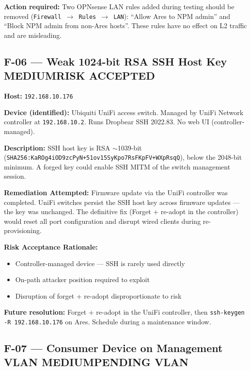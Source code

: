 \documentclass[11pt,a4paper]{article}
\newcommand{\medium}{\colorbox{medium}{\color{white}\small\textbf{MEDIUM}}}
\newcommand{\riskaccepted}{\colorbox{accepted}{\color{white}\small\textbf{RISK ACCEPTED}}}
\newcommand{\pendingvlan}{\colorbox{pending}{\color{white}\small\textbf{PENDING VLAN}}}
\begin{document}
\textbf{Action required:} Two OPNsense LAN rules added during testing should be removed
(\texttt{Firewall $\to$ Rules $\to$ LAN}): ``Allow Ares to NPM admin'' and ``Block NPM admin
from non-Ares hosts''. These rules have no effect on L2 traffic and are misleading.

\subsection{F-06 — Weak 1024-bit RSA SSH Host Key \quad \medium \quad \riskaccepted}

\textbf{Host:} \texttt{192.168.10.176}

\textbf{Device (identified):} Ubiquiti UniFi access switch. Managed by UniFi Network
controller at \texttt{192.168.10.2}. Runs Dropbear SSH 2022.83. No web UI (controller-managed).

\textbf{Description:} SSH host key is RSA $\sim$1039-bit
(\texttt{SHA256:KaROg4iOD9zcPyN+51ov15SyKpo7RsFKpFV+WXpRsqQ}), below the 2048-bit minimum.
A forged key could enable SSH MITM of the switch management session.

\textbf{Remediation Attempted:} Firmware update via the UniFi controller was completed.
UniFi switches persist the SSH host key across firmware updates — the key was unchanged.
The definitive fix (Forget + re-adopt in the controller) would reset all port configuration
and disrupt wired clients during re-provisioning.

\textbf{Risk Acceptance Rationale:}
\begin{itemize}[nosep]
  \item Controller-managed device — SSH is rarely used directly
  \item On-path attacker position required to exploit
  \item Disruption of forget + re-adopt disproportionate to risk
\end{itemize}

\textbf{Future resolution:} Forget + re-adopt in the UniFi controller, then
\texttt{ssh-keygen -R 192.168.10.176} on Ares. Schedule during a maintenance window.

\subsection{F-07 — Consumer Device on Management VLAN \quad \medium \quad \pendingvlan}
\end{document}
